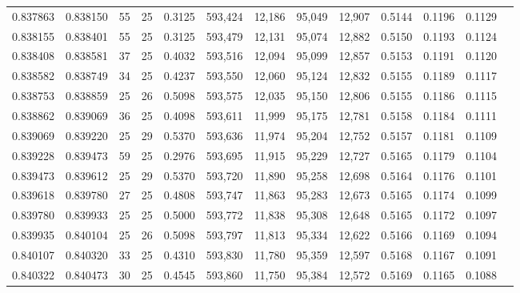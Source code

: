 \begin{tabular}{rrrrrrrrrrrrr}
0.837863 & 0.838150 &    55 &  25 &                                     0.3125 & 593,424 &  12,186 &  95,049 &  12,907 & 0.5144 & 0.1196 & 0.1129 \\
0.838155 & 0.838401 &    55 &  25 &                                     0.3125 & 593,479 &  12,131 &  95,074 &  12,882 & 0.5150 & 0.1193 & 0.1124 \\
0.838408 & 0.838581 &    37 &  25 &                                     0.4032 & 593,516 &  12,094 &  95,099 &  12,857 & 0.5153 & 0.1191 & 0.1120 \\
0.838582 & 0.838749 &    34 &  25 &                                     0.4237 & 593,550 &  12,060 &  95,124 &  12,832 & 0.5155 & 0.1189 & 0.1117 \\
0.838753 & 0.838859 &    25 &  26 &                                     0.5098 & 593,575 &  12,035 &  95,150 &  12,806 & 0.5155 & 0.1186 & 0.1115 \\
0.838862 & 0.839069 &    36 &  25 &                                     0.4098 & 593,611 &  11,999 &  95,175 &  12,781 & 0.5158 & 0.1184 & 0.1111 \\
0.839069 & 0.839220 &    25 &  29 &                                     0.5370 & 593,636 &  11,974 &  95,204 &  12,752 & 0.5157 & 0.1181 & 0.1109 \\
0.839228 & 0.839473 &    59 &  25 &                                     0.2976 & 593,695 &  11,915 &  95,229 &  12,727 & 0.5165 & 0.1179 & 0.1104 \\
0.839473 & 0.839612 &    25 &  29 &                                     0.5370 & 593,720 &  11,890 &  95,258 &  12,698 & 0.5164 & 0.1176 & 0.1101 \\
0.839618 & 0.839780 &    27 &  25 &                                     0.4808 & 593,747 &  11,863 &  95,283 &  12,673 & 0.5165 & 0.1174 & 0.1099 \\
0.839780 & 0.839933 &    25 &  25 &                                     0.5000 & 593,772 &  11,838 &  95,308 &  12,648 & 0.5165 & 0.1172 & 0.1097 \\
0.839935 & 0.840104 &    25 &  26 &                                     0.5098 & 593,797 &  11,813 &  95,334 &  12,622 & 0.5166 & 0.1169 & 0.1094 \\
0.840107 & 0.840320 &    33 &  25 &                                     0.4310 & 593,830 &  11,780 &  95,359 &  12,597 & 0.5168 & 0.1167 & 0.1091 \\
0.840322 & 0.840473 &    30 &  25 &                                     0.4545 & 593,860 &  11,750 &  95,384 &  12,572 & 0.5169 & 0.1165 & 0.1088 \\

\end{tabular}
